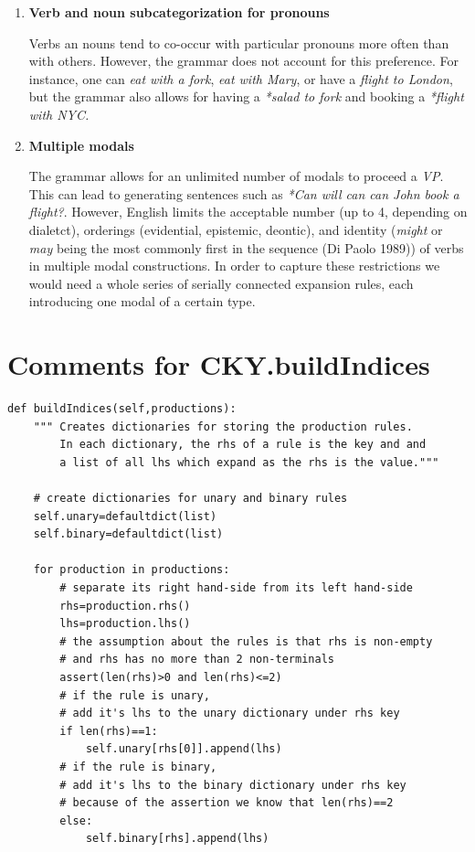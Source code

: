 \documentclass{article}
\begin{document}
\begin{description}
\begin{enumerate}
		\item
		\textbf{Verb and noun subcategorization for pronouns}
		
		Verbs an nouns tend to co-occur with particular pronouns more often than with others. However, the grammar does not account for this preference. For instance, one can \emph{eat with a fork}, \emph{eat with Mary}, or have a \emph{flight to London}, but the grammar also allows for having a \emph{*salad to fork} and booking a \emph{*flight with NYC.}
		
		\item
		\textbf{Multiple modals}
		
		The grammar allows for an unlimited number of modals to proceed a \emph{VP}. This can lead to generating sentences such as \emph{*Can will can can John book a flight?}. However, English limits the acceptable number (up to 4, depending on dialetct), orderings (evidential, epistemic, deontic), and identity (\emph{might} or \emph{may} being the most commonly first in the sequence (Di Paolo 1989)) of verbs in multiple modal constructions. In order to capture these restrictions we would need a whole series of serially connected expansion rules, each introducing one modal of a certain type.
	\end{enumerate}
\end{description}

\section{Comments for CKY.buildIndices}

\begin{lstlisting}
def buildIndices(self,productions):
	""" Creates dictionaries for storing the production rules.
	    In each dictionary, the rhs of a rule is the key and and
	    a list of all lhs which expand as the rhs is the value."""
	
	# create dictionaries for unary and binary rules
	self.unary=defaultdict(list)
	self.binary=defaultdict(list)
	
	for production in productions:
		# separate its right hand-side from its left hand-side
		rhs=production.rhs()
		lhs=production.lhs()
		# the assumption about the rules is that rhs is non-empty
		# and rhs has no more than 2 non-terminals
		assert(len(rhs)>0 and len(rhs)<=2)
		# if the rule is unary, 
		# add it's lhs to the unary dictionary under rhs key
		if len(rhs)==1:
			self.unary[rhs[0]].append(lhs)
		# if the rule is binary, 
		# add it's lhs to the binary dictionary under rhs key
		# because of the assertion we know that len(rhs)==2
		else:
			self.binary[rhs].append(lhs)
\end{lstlisting}
\end{document}

